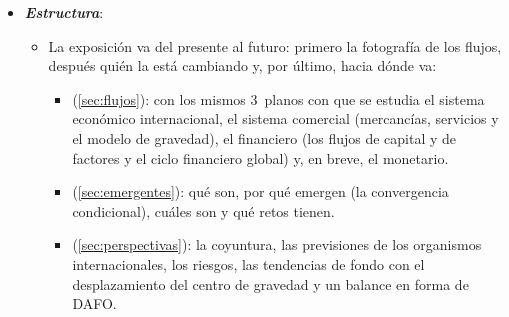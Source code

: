\documentclass[11pt]{article}
\begin{document}
\begin{itemize}
\item \textbf{\emph{Estructura}}:
  \begin{itemize}
  \item La exposición va del presente al futuro: primero la fotografía de los flujos, después quién la está cambiando y, por último, hacia dónde va:
    \begin{itemize}
    \item {} (\ref{sec:flujos}): con los mismos 3~planos con que se estudia el sistema económico internacional, el sistema comercial (mercancías, servicios y el modelo de gravedad), el financiero (los flujos de capital y de factores y el ciclo financiero global) y, en breve, el monetario.
    \item {} (\ref{sec:emergentes}): qué son, por qué emergen (la convergencia condicional), cuáles son y qué retos tienen.
    \item {} (\ref{sec:perspectivas}): la coyuntura, las previsiones de los organismos internacionales, los riesgos, las tendencias de fondo con el desplazamiento del centro de gravedad y un balance en forma de DAFO.
    \end{itemize}
  \end{itemize}
\end{itemize}
\end{document}
